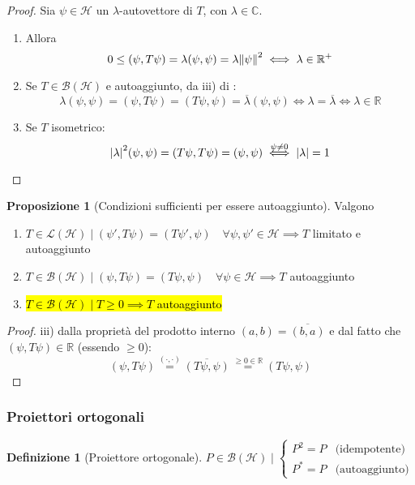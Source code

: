 \documentclass[a4paper,10pt]{article}
\theoremstyle{definition}
\newcommand{\re}{\mathbb{R}} %
\newcommand{\im}{\mathbb{C}} %
\newcommand{\hil}{\mathcal{H}} %
\theoremstyle{indentdefinition}
\newtheorem{defn}{Definizione}[section]
\theoremstyle{indenttheorem}
\newtheorem{prop}{Proposizione}
\theoremstyle{myremark}
\theoremstyle{indentgeneral}
\begin{document}
\begin{proof}
    Sia $\psi\in\hil$ un $\lambda$-autovettore di $T$, con $\lambda\in\im$.
    \begin{enumerate}
        \item Allora
        $$0\le (\psi,T\psi)=\lambda(\psi,\psi)=\lambda\norm{\psi}^2\iff \lambda\in\re^+$$
        \item Se $T\in\mathcal{B}(\hil)$ e autoaggiunto, da iii) di :
        $$\lambda(\psi,\psi)=(\psi,T\psi)=(T\psi,\psi)=\overline{\lambda}(\psi,\psi)\iff \lambda=\overline{\lambda}\iff \lambda\in\re$$
        \item Se $T$ isometrico:
        $$\abs{\lambda}^2(\psi,\psi)=(T\psi,T\psi)=(\psi,\psi)\overset{\psi\ne0}{\iff}\abs{\lambda}=1 $$
    \end{enumerate}
\end{proof}

\begin{prop}[Condizioni sufficienti per essere autoaggiunto]
    Valgono
    \begin{enumerate}
        \item $T\in\mathcal{L}(\hil)\mid (\psi',T\psi)=(T\psi',\psi)\quad\forall\psi,\psi'\in\hil\implies T$ limitato e autoaggiunto
         \item $T\in\mathcal{B}(\hil)\mid (\psi,T\psi)=(T\psi,\psi)\quad\forall\psi\in\hil\implies T$ autoaggiunto
         \item \hl{$T\in\mathcal{B}(\hil)\mid T\ge 0\implies T$ autoaggiunto}
    \end{enumerate}
\end{prop}
\begin{proof}
    iii) dalla proprietà del prodotto interno $(a,b)=\overline{(b,a)}$ e dal fatto che $(\psi,T\psi)\in \re$ (essendo $\ge0$):
    $$(\psi,T\psi)\overset{(\cdot,\cdot)}{=}\overline{(T\psi,\psi)}\overset{\ge0\in\re}{=}(T\psi,\psi)$$
\end{proof}


\subsubsection{Proiettori ortogonali}

\begin{defn}[Proiettore ortogonale]\label{defn-proiettore-ortogonale}
    $P\in\mathcal{B}(\hil)\mid \begin{cases}
        P^2=P & \text{(idempotente)}\\
        P^*=P & \text{(autoaggiunto)}
    \end{cases}$
\end{defn}
\end{document}
